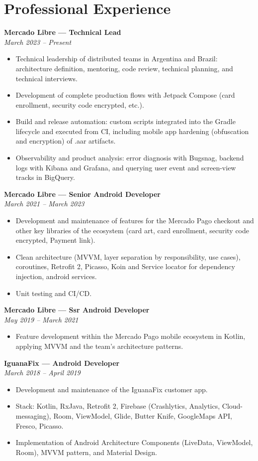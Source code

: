 \documentclass[11pt,a4paper]{article}
\newcommand{\jobtitle}[2]{
    \noindent\textbf{#1}\\
    \textit{#2}\par\vspace{0.5em}
}
\begin{document}
\section{Professional Experience}

\jobtitle{Mercado Libre — Technical Lead}{March 2023 – Present}
\begin{itemize}[leftmargin=*]
    \item Technical leadership of distributed teams in Argentina and Brazil: architecture definition, mentoring, code review, technical planning, and technical interviews.
    \item Development of complete production flows with Jetpack Compose (card enrollment, security code encrypted, etc.).
    \item Build and release automation: custom scripts integrated into the Gradle lifecycle and executed from CI, including mobile app hardening (obfuscation and encryption) of .aar artifacts.
    \item Observability and product analysis: error diagnosis with Bugsnag, backend logs with Kibana and Grafana, and querying user event and screen-view tracks in BigQuery.
\end{itemize}

\jobtitle{Mercado Libre — Senior Android Developer}{March 2021 – March 2023}
\begin{itemize}[leftmargin=*]
    \item Development and maintenance of features for the Mercado Pago checkout and other key libraries of the ecosystem (card art, card enrollment, security code encrypted, Payment link).
    \item Clean architecture (MVVM, layer separation by responsibility, use cases), coroutines, Retrofit 2, Picasso, Koin and Service locator for dependency injection, android services.
    \item Unit testing and CI/CD.
\end{itemize}

\jobtitle{Mercado Libre — Ssr Android Developer}{May 2019 – March 2021}
\begin{itemize}[leftmargin=*]
    \item Feature development within the Mercado Pago mobile ecosystem in Kotlin, applying MVVM and the team's architecture patterns.
\end{itemize}

\jobtitle{IguanaFix — Android Developer}{March 2018 – April 2019}
\begin{itemize}[leftmargin=*]
    \item Development and maintenance of the IguanaFix customer app.
    \item Stack: Kotlin, RxJava, Retrofit 2, Firebase (Crashlytics, Analytics, Cloud-messaging), Room, ViewModel, Glide, Butter Knife, GoogleMaps API, Fresco, Picasso.
    \item Implementation of Android Architecture Components (LiveData, ViewModel, Room), MVVM pattern, and Material Design.
\end{itemize}
\end{document}

